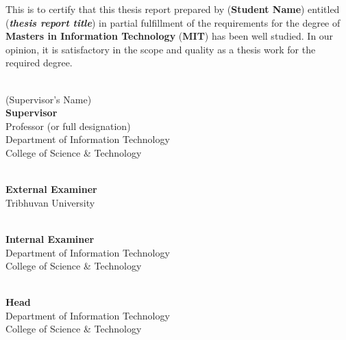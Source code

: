 \noindent
This is to certify that this thesis report prepared by (\textbf{Student Name}) entitled (\textbf{\textit{thesis report title}}) in partial fulfillment of the requirements for the degree of \textbf{Masters in Information Technology} (\textbf{MIT}) has been well studied. In our opinion, it is satisfactory in the scope and quality as a thesis work for the required degree.

\vspace{2cm}

\begin{flushleft}
    \begin{tabbing}
        \makebox[8cm]{\dotfill} \\
        (Supervisor’s Name)                     \\
        \textbf{Supervisor}                     \\
        Professor (or full designation)    \\
        Department of Information Technology    \\
        College of Science \& Technology        \\
    \end{tabbing}
    
    \vspace{1.25cm}
    
    \begin{tabbing}
        \makebox[8cm]{\dotfill} \\
        \textbf{External Examiner} \\
        Tribhuvan University \\
    \end{tabbing}
    
    \vspace{1.25cm}
    
    \begin{tabbing}
        \makebox[8cm]{\dotfill} \\
        \textbf{Internal Examiner} \\
        Department of Information Technology \\
        College of Science \& Technology \\
    \end{tabbing}
    
    \vspace{1.25cm}
    
    \begin{tabbing}
        \makebox[8cm]{\dotfill} \\
        \textbf{Head} \\
        Department of Information Technology \\
        College of Science \& Technology \\
    \end{tabbing}
\end{flushleft}